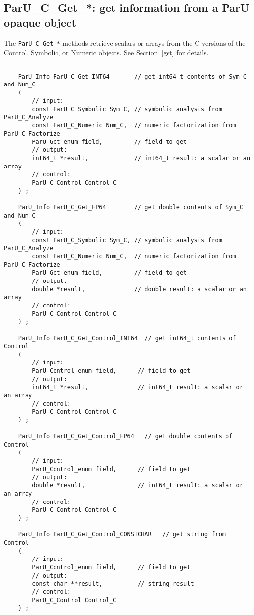 \documentclass[12pt]{article}
\begin{document}
\subsection{{\sf ParU\_C\_Get\_*}: get information from a ParU opaque object}

The \verb'ParU_C_Get_*' methods retrieve scalars or arrays from the C versions
of the Control, Symbolic, or Numeric objects.  See Section~\ref{get} for
details.

    {\footnotesize
    \begin{verbatim}

    ParU_Info ParU_C_Get_INT64       // get int64_t contents of Sym_C and Num_C
    (
        // input:
        const ParU_C_Symbolic Sym_C, // symbolic analysis from ParU_C_Analyze
        const ParU_C_Numeric Num_C,  // numeric factorization from ParU_C_Factorize
        ParU_Get_enum field,         // field to get
        // output:
        int64_t *result,             // int64_t result: a scalar or an array
        // control:
        ParU_C_Control Control_C
    ) ;

    ParU_Info ParU_C_Get_FP64        // get double contents of Sym_C and Num_C
    (
        // input:
        const ParU_C_Symbolic Sym_C, // symbolic analysis from ParU_C_Analyze
        const ParU_C_Numeric Num_C,  // numeric factorization from ParU_C_Factorize
        ParU_Get_enum field,         // field to get
        // output:
        double *result,              // double result: a scalar or an array
        // control:
        ParU_C_Control Control_C
    ) ;

    ParU_Info ParU_C_Get_Control_INT64  // get int64_t contents of Control
    (
        // input:
        ParU_Control_enum field,      // field to get
        // output:
        int64_t *result,              // int64_t result: a scalar or an array
        // control:
        ParU_C_Control Control_C
    ) ;

    ParU_Info ParU_C_Get_Control_FP64   // get double contents of Control
    (
        // input:
        ParU_Control_enum field,      // field to get
        // output:
        double *result,               // int64_t result: a scalar or an array
        // control:
        ParU_C_Control Control_C
    ) ;

    ParU_Info ParU_C_Get_Control_CONSTCHAR   // get string from Control
    (
        // input:
        ParU_Control_enum field,      // field to get
        // output:
        const char **result,          // string result
        // control:
        ParU_C_Control Control_C
    ) ; \end{verbatim} }
\end{document}
